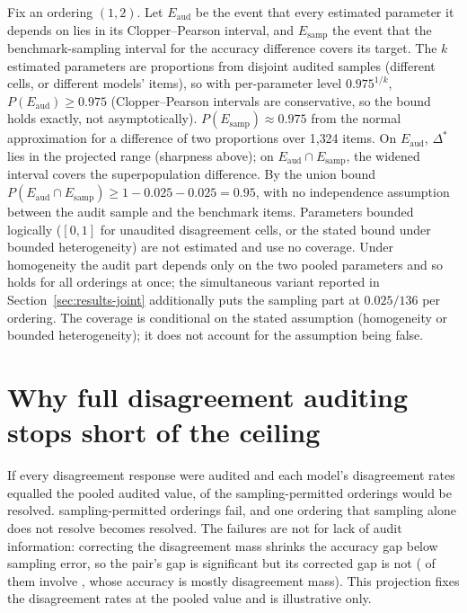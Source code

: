 Fix an ordering $(1,2)$. Let $E_{\text{aud}}$ be the event that every
estimated parameter it depends on lies in its Clopper--Pearson interval, and
$E_{\text{samp}}$ the event that the benchmark-sampling interval for the
accuracy difference covers its target. The $k$ estimated parameters are
proportions from disjoint audited samples (different cells, or different
models' items), so with per-parameter level $0.975^{1/k}$,
$P(E_{\text{aud}})\ge0.975$ (Clopper--Pearson intervals are conservative, so
the bound holds exactly, not asymptotically). $P(E_{\text{samp}})\approx0.975$
from the normal approximation for a difference of two proportions over
1{,}324 items. On $E_{\text{aud}}$, $\Delta^\ast$ lies in the projected range
(sharpness above); on $E_{\text{aud}}\cap E_{\text{samp}}$, the widened
interval covers the superpopulation difference. By the union bound
$P(E_{\text{aud}}\cap E_{\text{samp}})\ge1-0.025-0.025=0.95$, with no
independence assumption between the audit sample and the benchmark items.
Parameters bounded logically ($[0,1]$ for unaudited disagreement cells, or
the stated bound under bounded heterogeneity) are not estimated and use no
coverage. Under homogeneity the audit part depends only on the two pooled
parameters and so holds for all orderings at once; the simultaneous variant
reported in Section~\ref{sec:results-joint} additionally puts the sampling
part at $0.025/136$ per ordering. The coverage is conditional on the stated
assumption (homogeneity or bounded heterogeneity); it does not account for
the assumption being false.

\section{Why full disagreement auditing stops short of the ceiling}
\label{sec:appendix-census}

If every disagreement response were audited and each model's disagreement
rates equalled the pooled audited value, \nCensusComb{} of the \nCeiling{}
sampling-permitted orderings would be resolved. \nCensusGapShrink{}
sampling-permitted orderings fail, and one ordering that sampling alone does
not resolve becomes resolved. The failures are not for lack of audit
information: correcting the disagreement mass shrinks the accuracy gap below
sampling error, so the pair's  gap is significant but its
corrected gap is not (\nCensusGapShrinkCmdr{} of them involve ,
whose  accuracy is mostly disagreement mass). This
projection fixes the disagreement rates at the pooled value and is
illustrative only.

